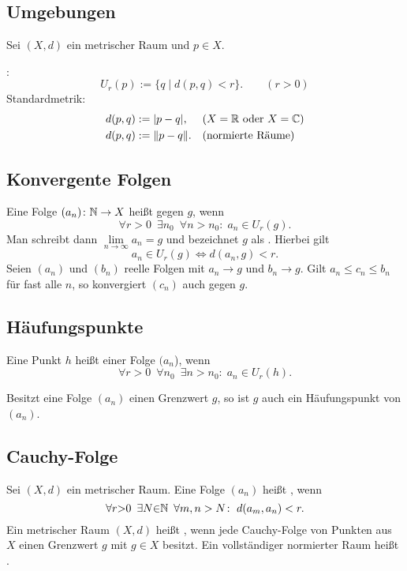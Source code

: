 \subsection{Umgebungen}

Sei $(X,d)$ ein metrischer Raum und $p\in X$.

{}
:
\begin{equation}
U_r(p) := \{q\mid d(p,q)<r\}.\qquad (r>0)
\end{equation}
Standardmetrik:
\begin{align}
d(p,q) &:= |p-q|,\quad\; (\text{$X=\mathbb R$ oder $X=\mathbb C$})\\
d(p,q) &:=\|p-q\|.\quad (\text{normierte Räume})
\end{align}

\subsection{Konvergente Folgen}
{}
Eine Folge $(a_n)\colon \mathbb N\to X$ heißt  gegen $g$, wenn%
\begin{equation}\label{eq:konvergent}
\forall r{>}0\enspace\exists n_0\enspace\forall n{>}n_0\colon\;
a_n\in U_r(g).
\end{equation}
Man schreibt dann $\lim\limits_{n\to\infty} a_n=g$ und bezeichnet
$g$ als .
Hierbei gilt
\begin{equation}
a_n\in U_r(g)\iff d(a_n,g)<r.
\end{equation}
 Seien $(a_n)$ und $(b_n)$ reelle Folgen
mit $a_n\to g$ und $b_n\to g$. Gilt $a_n\le c_n\le b_n$ für fast alle
$n$, so konvergiert $(c_n)$ auch gegen $g$.

\subsection{Häufungspunkte}
\begin{Definition}
Eine Punkt $h$ heißt  einer Folge $(a_n$), wenn
\begin{equation}
\forall r{>}0\enspace\forall n_0\enspace\exists n{>}n_0\colon\;
a_n\in U_r(h).
\end{equation}
\end{Definition}
\noindent
Besitzt eine Folge $(a_n)$ einen Grenzwert $g$, so ist $g$ auch ein
Häufungspunkt von $(a_n)$.

\subsection{Cauchy-Folge}
{}
Sei $(X,d)$ ein metrischer Raum.
Eine Folge $(a_n)$ heißt ,
wenn
\begin{equation}
\forall r{>}0\enspace\exists N{\in}\mathbb N\enspace\forall m,n>N\colon\;
d(a_m,a_n)<r.
\end{equation}
\noindent
Ein metrischer Raum $(X,d)$ heißt ,
wenn jede Cauchy-Folge von Punkten aus $X$ einen Grenzwert $g$
mit $g\in X$ besitzt. Ein vollständiger normierter Raum heißt
.

